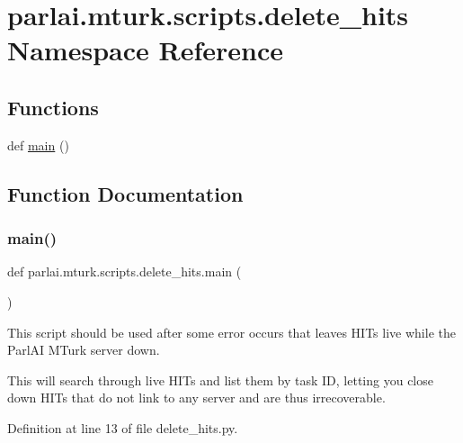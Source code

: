 \hypertarget{namespaceparlai_1_1mturk_1_1scripts_1_1delete__hits}{}\section{parlai.\+mturk.\+scripts.\+delete\+\_\+hits Namespace Reference}
\label{namespaceparlai_1_1mturk_1_1scripts_1_1delete__hits}
\subsection*{Functions}
\begin{DoxyCompactItemize}
\item 
def \hyperlink{namespaceparlai_1_1mturk_1_1scripts_1_1delete__hits_a8dd24ac1eb6692d9295969d598138d05}{main} ()
\end{DoxyCompactItemize}


\subsection{Function Documentation}
\mbox{\label{namespaceparlai_1_1mturk_1_1scripts_1_1delete__hits_a8dd24ac1eb6692d9295969d598138d05}} 
\subsubsection{\texorpdfstring{main()}{main()}}
{\footnotesize\ttfamily def parlai.\+mturk.\+scripts.\+delete\+\_\+hits.\+main (\begin{DoxyParamCaption}{ }\end{DoxyParamCaption})}

\begin{DoxyVerb}This script should be used after some error occurs that leaves HITs live while the
ParlAI MTurk server down.

This will search through live HITs and list them by task ID, letting you close down
HITs that do not link to any server and are thus irrecoverable.
\end{DoxyVerb}
 

Definition at line 13 of file delete\+\_\+hits.\+py.


